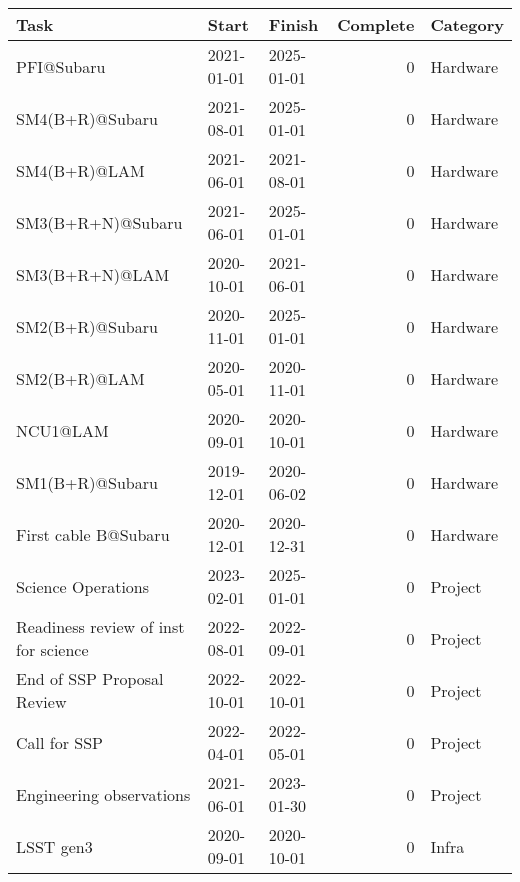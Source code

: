 \begin{tabular}{lllrl}
\toprule
                                        Task &       Start &      Finish &  Complete &               Category \\
\midrule
                                  PFI@Subaru &  2021-01-01 &  2025-01-01 &         0 &               Hardware \\
                             SM4(B+R)@Subaru &  2021-08-01 &  2025-01-01 &         0 &               Hardware \\
                                SM4(B+R)@LAM &  2021-06-01 &  2021-08-01 &         0 &               Hardware \\
                           SM3(B+R+N)@Subaru &  2021-06-01 &  2025-01-01 &         0 &               Hardware \\
                              SM3(B+R+N)@LAM &  2020-10-01 &  2021-06-01 &         0 &               Hardware \\
                             SM2(B+R)@Subaru &  2020-11-01 &  2025-01-01 &         0 &               Hardware \\
                                SM2(B+R)@LAM &  2020-05-01 &  2020-11-01 &         0 &               Hardware \\
                                    NCU1@LAM &  2020-09-01 &  2020-10-01 &         0 &               Hardware \\
                             SM1(B+R)@Subaru &  2019-12-01 &  2020-06-02 &         0 &               Hardware \\
                        First cable B@Subaru &  2020-12-01 &  2020-12-31 &         0 &               Hardware \\
                          Science Operations &  2023-02-01 &  2025-01-01 &         0 &                Project \\
        Readiness review of inst for science &  2022-08-01 &  2022-09-01 &         0 &                Project \\
                  End of SSP Proposal Review &  2022-10-01 &  2022-10-01 &         0 &                Project \\
                                Call for SSP &  2022-04-01 &  2022-05-01 &         0 &                Project \\
                    Engineering observations &  2021-06-01 &  2023-01-30 &         0 &                Project \\
                                   LSST gen3 &  2020-09-01 &  2020-10-01 &         0 &                  Infra \\

\end{tabular}
